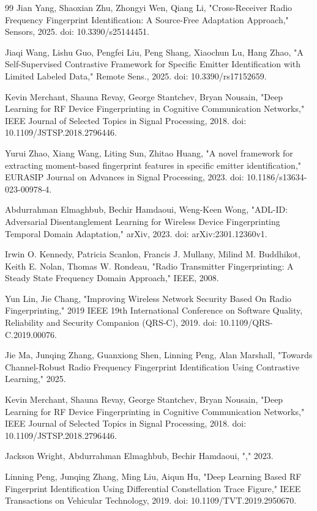 \documentclass[conference]{IEEEtran}
\begin{document}
\begin{thebibliography}{99}
Jian Yang, Shaoxian Zhu, Zhongyi Wen, Qiang Li, "Cross-Receiver Radio Frequency Fingerprint Identification: A Source-Free Adaptation Approach," Sensors, 2025. doi: 10.3390/s25144451.

Jiaqi Wang, Lishu Guo, Pengfei Liu, Peng Shang, Xiaochun Lu, Hang Zhao, "A Self-Supervised Contrastive Framework for Specific Emitter Identification with Limited Labeled Data," Remote Sens., 2025. doi: 10.3390/rs17152659.

Kevin Merchant, Shauna Revay, George Stantchev, Bryan Nousain, "Deep Learning for RF Device Fingerprinting in Cognitive Communication Networks," IEEE Journal of Selected Topics in Signal Processing, 2018. doi: 10.1109/JSTSP.2018.2796446.

Yurui Zhao, Xiang Wang, Liting Sun, Zhitao Huang, "A novel framework for extracting moment-based fingerprint features in specific emitter identification," EURASIP Journal on Advances in Signal Processing, 2023. doi: 10.1186/s13634-023-00978-4.

Abdurrahman Elmaghbub, Bechir Hamdaoui, Weng-Keen Wong, "ADL-ID: Adversarial Disentanglement Learning for Wireless Device Fingerprinting Temporal Domain Adaptation," arXiv, 2023. doi: arXiv:2301.12360v1.

Irwin O. Kennedy, Patricia Scanlon, Francis J. Mullany, Milind M. Buddhikot, Keith E. Nolan, Thomas W. Rondeau, "Radio Transmitter Fingerprinting: A Steady State Frequency Domain Approach," IEEE, 2008.

Yun Lin, Jie Chang, "Improving Wireless Network Security Based On Radio Fingerprinting," 2019 IEEE 19th International Conference on Software Quality, Reliability and Security Companion (QRS-C), 2019. doi: 10.1109/QRS-C.2019.00076.

Jie Ma, Junqing Zhang, Guanxiong Shen, Linning Peng, Alan Marshall, "Towards Channel-Robust Radio Frequency Fingerprint Identification Using Contrastive Learning," 2025.

Kevin Merchant, Shauna Revay, George Stantchev, Bryan Nousain, "Deep Learning for RF Device Fingerprinting in Cognitive Communication Networks," IEEE Journal of Selected Topics in Signal Processing, 2018. doi: 10.1109/JSTSP.2018.2796446.

Jackson Wright, Abdurrahman Elmaghbub, Bechir Hamdaoui, "," 2023.

Linning Peng, Junqing Zhang, Ming Liu, Aiqun Hu, "Deep Learning Based RF Fingerprint Identification Using Differential Constellation Trace Figure," IEEE Transactions on Vehicular Technology, 2019. doi: 10.1109/TVT.2019.2950670.


\end{thebibliography}
\end{document}
